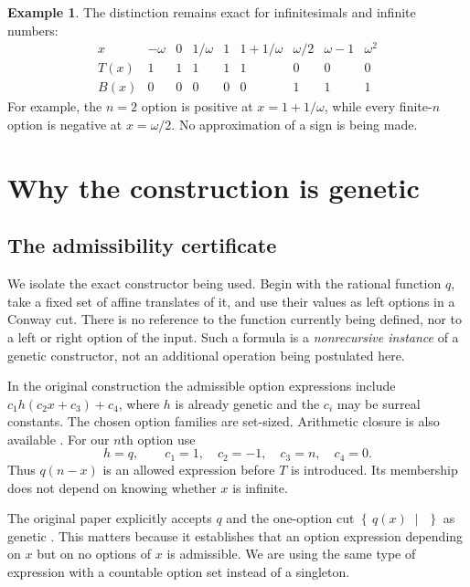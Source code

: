 \documentclass[11pt,letterpaper]{article}
\numberwithin{equation}{section}
\theoremstyle{definition}
\newtheorem{example}[theorem]{Example}
\theoremstyle{remark}
\newcommand{\cut}[2]{\left\{\,#1\;\middle|\;#2\,\right\}}
\newcommand{\source}[2]{\cite[#1]{#2}}
\begin{document}
\begin{example}
The distinction remains exact for infinitesimals and infinite numbers:
\[
\begin{array}{c|cccccccc}
x&-\omega&0&1/\omega&1&1+1/\omega&\omega/2&\omega-1&\omega^2\\ \hline
T(x)&1&1&1&1&1&0&0&0\\
B(x)&0&0&0&0&0&1&1&1
\end{array}
\]
For example, the $n=2$ option is positive at $x=1+1/\omega$, while every
finite-$n$ option is negative at $x=\omega/2$. No approximation of a sign is
being made.
\end{example}

\section{Why the construction is genetic}\label{sec:admissibility}
\subsection{The admissibility certificate}
We isolate the exact constructor being used. Begin with the rational
function $q$, take a fixed set of affine translates of it, and use their
values as left options in a Conway cut. There is no reference to the
function currently being defined, nor to a left or right option of the
input. Such a formula is a \emph{nonrecursive instance} of a genetic
constructor, not an additional operation being postulated here.

In the original construction the admissible option expressions include
$c_1h(c_2x+c_3)+c_4$, where $h$ is already genetic and the $c_i$ may be
surreal constants. The chosen option families are set-sized. Arithmetic
closure is also available \source{pp.~9--10}{RSS}. For our $n$th option use
\[
 h=q,\qquad c_1=1,\quad c_2=-1,\quad c_3=n,\quad c_4=0.
\]
Thus $q(n-x)$ is an allowed expression before $T$ is introduced. Its
membership does not depend on knowing whether $x$ is infinite.

The original paper explicitly accepts $q$ and the one-option cut
$\cut{q(x)}{}$ as genetic \source{p.~11}{RSS}. This matters because it
establishes that an option expression depending on $x$ but on no options
of $x$ is admissible. We are using the same type of expression with a
countable option set instead of a singleton.
\end{document}
